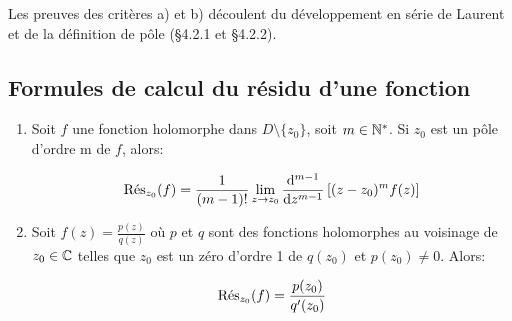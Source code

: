 \begin{remark}
    Les preuves des critères a) et b) découlent du développement en série de Laurent et de la définition de pôle (§4.2.1 et §4.2.2).
\end{remark}

\newpage
\subsection{Formules de calcul du résidu d'une fonction}

\begin{method}\hfill
    
    \begin{enumerate}[label=\alph*)]
    \item 
    Soit $f$ une fonction holomorphe dans $D\setminus \{ z_0 \}$, soit $m \in \N^\ast$.
    Si $z_0$ est un pôle d'ordre m de $f$, alors:
    
    \[ \Res_{z_0}(f) = \frac{1}{(m - 1)!} \lim\limits_{z \rightarrow z_0} \frac{\dd^{m-1}}{\dz^{m - 1}} \left[ (z - z_0)^m f(z) \right] \]
    
    \item 
    Soit $f(z) = \frac{p(z)}{q(z)}$ où $p$ et $q$ sont des fonctions holomorphes au voisinage de $z_0 \in \Cx$ telles que $z_0$ est un zéro d'ordre 1 de $q(z_0)$ et $p(z_0) \neq 0$.
    Alors:
    
    \[ \Res_{z_0}(f) = \frac{p(z_0)}{q'(z_0)} \]
    \end{enumerate}
\end{method}

